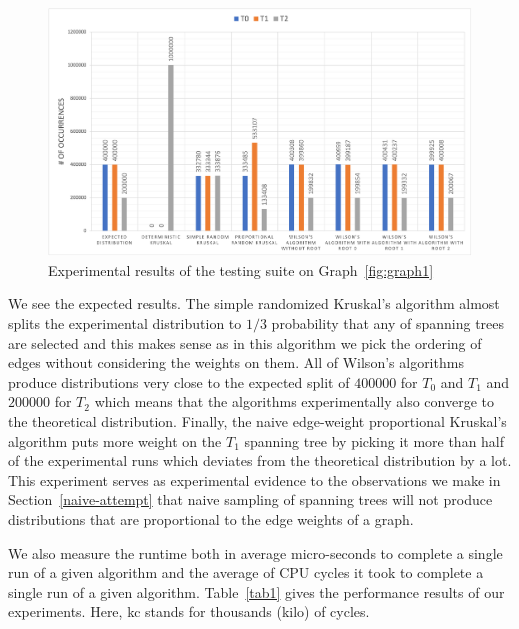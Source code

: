 \documentclass[11pt]{article}
\begin{document}
\begin{figure}[ht]
\includegraphics[scale=0.60]{fig1.png}
\caption{Experimental results of the testing suite on Graph~\ref{fig:graph1}}
\centering
\label{fig1}
\end{figure}

We see the expected results. The simple randomized Kruskal's algorithm almost splits the experimental distribution to $1/3$ probability that any of spanning trees are selected and this makes sense as in this algorithm we pick the ordering of edges without considering the weights on them. All of Wilson's algorithms produce distributions very close to the expected split of $400000$ for $T_0$ and $T_1$ and $200000$ for $T_2$ which means that the algorithms experimentally also converge to the theoretical distribution. Finally, the naive edge-weight proportional Kruskal's algorithm puts more weight on the $T_1$ spanning tree by picking it more than half of the experimental runs which deviates from the theoretical distribution by a lot. This experiment serves as experimental evidence to the observations we make in Section~\ref{naive-attempt} that naive sampling of spanning trees will not produce distributions that are proportional to the edge weights of a graph.

We also measure the runtime both in average micro-seconds to complete a single run of a given algorithm and the average of CPU cycles it took to complete a single run of a given algorithm. Table~\ref{tab1} gives the performance results of our experiments. Here, kc stands for thousands (kilo) of cycles.
\end{document}
